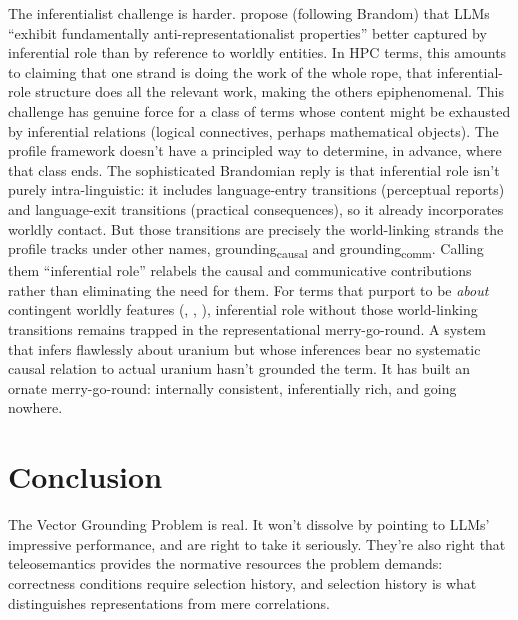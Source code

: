 \documentclass[12pt]{article}
\newcommand{\gcausal}{grounding\textsubscript{causal}}
\newcommand{\gcomm}{grounding\textsubscript{comm}}
\begin{document}
The inferentialist challenge is harder. \textcite{arai_tsugawa_2024_inferentialist_semantics_llms} propose (following Brandom) that LLMs \enquote{exhibit fundamentally anti-representationalist properties} \citep[1]{arai_tsugawa_2024_inferentialist_semantics_llms} better captured by inferential role than by reference to worldly entities. In HPC terms, this amounts to claiming that one strand is doing the work of the whole rope, that inferential-role structure does all the relevant work, making the others epiphenomenal. This challenge has genuine force for a class of terms whose content might be exhausted by inferential relations (logical connectives, perhaps mathematical objects). The profile framework doesn't have a principled way to determine, in advance, where that class ends. The sophisticated Brandomian reply is that inferential role isn't purely intra-linguistic: it includes language-entry transitions (perceptual reports) and language-exit transitions (practical consequences), so it already incorporates worldly contact. But those transitions are precisely the world-linking strands the profile tracks under other names, \gcausal{} and \gcomm{}. Calling them \enquote{inferential role} relabels the causal and communicative contributions rather than eliminating the need for them. For terms that purport to be \emph{about} contingent worldly features (, , ), inferential role without those world-linking transitions remains trapped in the representational merry-go-round. A system that infers flawlessly about uranium but whose inferences bear no systematic causal relation to actual uranium hasn't grounded the term. It has built an ornate merry-go-round: internally consistent, inferentially rich, and going nowhere.

\section{Conclusion}
\label{sec:conclusion}

The Vector Grounding Problem is real. It won't dissolve by pointing to LLMs' impressive performance, and \textcite{coelho_mollo_milliere_2026_vector_grounding_problem} are right to take it seriously. They're also right that teleosemantics provides the normative resources the problem demands: correctness conditions require selection history, and selection history is what distinguishes representations from mere correlations.
\end{document}
